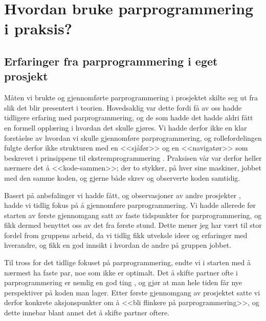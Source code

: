 \section{Hvordan bruke parprogrammering i praksis?}

\subsection{Erfaringer fra parprogrammering i eget prosjekt}

Måten vi brukte og gjennomførte parprogrammering i prosjektet skilte seg ut fra slik det blir presentert i teorien. 
Hovedsaklig var dette fordi få av oss hadde tidligere erfaring med parprogrammering, og de som hadde det hadde aldri fått en formell opplæring i hvordan det skulle gjøres.
Vi hadde derfor ikke en klar forståelse av hvordan vi skulle gjennomføre parprogrammering, og rollefordelingen fulgte derfor ikke strukturen med en <<sjåfør>> og en <<navigatør>> som beskrevet i prinsippene til ekstremprogrammering \cite{kniberg2015}.
Praksisen vår var derfor heller nærmere det å <<kode-sammen>>; der to stykker, på hver sine maskiner, jobbet med den samme koden, og gjerne både skrev og observerte koden samtidig.

Basert på anbefalinger vi hadde fått, og observasjoner av andre prosjekter \cite{kniberg2015}, hadde vi tidlig fokus på å gjennomføre parprogrammering.
Vi hadde allerede før starten av første gjennomgang satt av faste tidspunkter for parprogrammering, og fikk dermed benyttet oss av det fra første stund.
Dette mener jeg har vært til stor fordel from gruppens arbeid, da vi tidlig fikk utveksle ideer og erfaringer med hverandre, og fikk en god innsikt i hvordan de andre på gruppen jobbet.

Til tross for det tidlige fokuset på parprogrammering, endte vi i starten med å nærmest ha faste par, noe som ikke er optimalt.
Det å skifte partner ofte i parprogrammering er nemlig en god ting \cite{kniberg2015}, og gjør at man hele tiden får nye perspektiver på koden man lager.
Etter første gjennomgang av prosjektet satte vi derfor konkrete aksjonspunkter om å <<bli flinkere på parprogrammering>>, og dette innebar blant annet det å skifte partner oftere.

